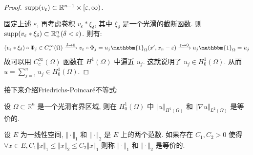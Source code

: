 \documentclass[11pt]{ctexart}[UTF8]
\begin{document}
\begin{proof}
    $\operatorname{supp}(v_{\varepsilon}) \subset \mathbb{R}^{n-1}\times [\varepsilon, \infty)$.\par
    固定上述 $\varepsilon$, 再考虑卷积 $v_{\varepsilon} * \xi_{\delta}$, 其中 $\xi_{\delta}$ 是一个光滑的截断函数. 则 $\operatorname{supp}(v_{\varepsilon} * \xi_{\delta}) \subset \mathbb{R}^{n}_{+}(\delta < \varepsilon)$. 则有:
    \begin{equation*}
        (v_{\varepsilon} * \xi_{\delta}) \circ \Phi_{j} \in C_c^{\infty}(\Omega) \xlongrightarrow{\delta \to 0} v_{\varepsilon} \circ \Phi_{j} = u_{j}\mathbbm{1}_{\Omega}(x', x_n - \varepsilon) \xlongrightarrow{\varepsilon \to 0} u_{j}\mathbbm{1}_{\Omega} = u_{j}
    \end{equation*}
    故可以用 $C_c^{\infty}(\Omega)$ 函数在 $H^{1}(\Omega)$ 中逼近 $u_{j}$. 这就说明了 $u_{j} \in H_{0}^{1}(\Omega)$. 从而 $u = \sum\limits_{j=1}^{n} u_{j} \in H_{0}^{1}(\Omega)$.
\end{proof}
接下来介绍Friedrichs-Poincaré不等式:\par
设 $\Omega \subset \mathbb{R}^n$ 是一个光滑有界区域, 则在 $H_{0}^{1}(\Omega)$ 中 $\Vert u \Vert_{H^1(\Omega)}$ 和 $\Vert \nabla u \Vert_{L^2(\Omega)}$ 是等价的. 
\begin{remark}
    设 $E$ 为一线性空间, $\Vert \cdot \Vert_{1}$ 和 $\Vert \cdot \Vert_{2}$ 是 $E$ 上的两个范数. 如果存在 $C_{1}, C_{2} > 0$ 使得 $\forall x \in E, C_{1}\Vert x \Vert_{1} \leq \Vert x \Vert_{2}\leq C_{2}\Vert x \Vert_{1} $ 
    则称 $\Vert \cdot \Vert_{1}$ 和 $\Vert \cdot \Vert_{2}$ 是等价的. 
\end{remark}
\end{document}
